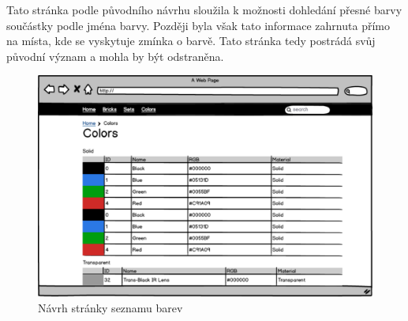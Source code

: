 Tato stránka podle původního návrhu sloužila k možnosti dohledání přesné barvy součástky podle jména barvy. Později byla však tato informace zahrnuta přímo na místa, kde se vyskytuje zmínka o barvě. Tato stránka tedy postrádá svůj původní význam a mohla by být odstraněna.

\begin{figure}[htbp]
    \centering
    \includegraphics[width=\textwidth,height=\textheight,keepaspectratio]{pdfs/wireframe_colors.pdf}
    \caption{Návrh stránky seznamu barev}\label{wireframe-barvy}
\end{figure}